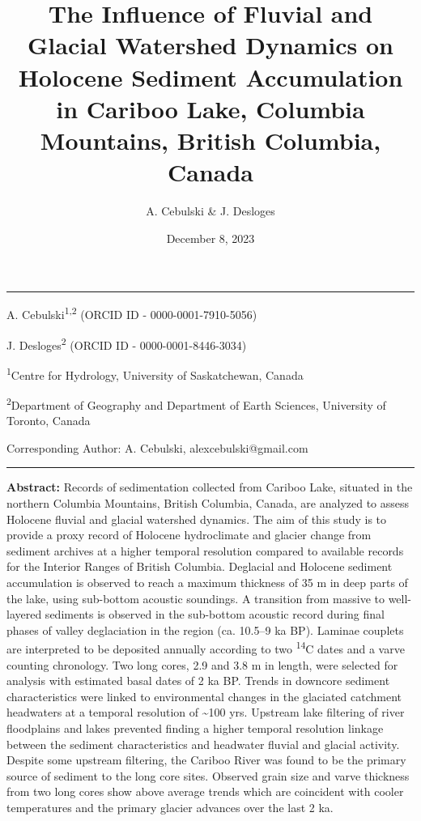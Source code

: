 \documentclass[
  letterpaper,
  DIV=11,
  numbers=noendperiod]{scrartcl}
\title{The Influence of Fluvial and Glacial Watershed Dynamics on
Holocene Sediment Accumulation in Cariboo Lake, Columbia Mountains,
British Columbia, Canada}
\author{A. Cebulski \& J. Desloges}
\date{December 8, 2023}
\begin{document}
\maketitle
\ifdefined\Shaded\renewenvironment{Shaded}{\begin{tcolorbox}[borderline west={3pt}{0pt}{shadecolor}, boxrule=0pt, frame hidden, breakable, enhanced, interior hidden, sharp corners]}{\end{tcolorbox}}\fi

\begin{center}\rule{0.5\linewidth}{0.5pt}\end{center}

A. Cebulski\textsuperscript{1,2} (ORCID ID - 0000-0001-7910-5056)

J. Desloges\textsuperscript{2} (ORCID ID - 0000-0001-8446-3034)

\textsuperscript{1}Centre for Hydrology, University of Saskatchewan,
Canada

\textsuperscript{2}Department of Geography and Department of Earth
Sciences, University of Toronto, Canada

Corresponding Author: A. Cebulski, alexcebulski@gmail.com

\begin{center}\rule{0.5\linewidth}{0.5pt}\end{center}

\pagebreak

\textbf{Abstract:} Records of sedimentation collected from Cariboo Lake,
situated in the northern Columbia Mountains, British Columbia, Canada,
are analyzed to assess Holocene fluvial and glacial watershed dynamics.
The aim of this study is to provide a proxy record of Holocene
hydroclimate and glacier change from sediment archives at a higher
temporal resolution compared to available records for the Interior
Ranges of British Columbia. Deglacial and Holocene sediment accumulation
is observed to reach a maximum thickness of 35 m in deep parts of the
lake, using sub-bottom acoustic soundings. A transition from massive to
well-layered sediments is observed in the sub-bottom acoustic record
during final phases of valley deglaciation in the region (ca. 10.5--9 ka
BP). Laminae couplets are interpreted to be deposited annually according
to two \textsuperscript{14}C dates and a varve counting chronology. Two
long cores, 2.9 and 3.8 m in length, were selected for analysis with
estimated basal dates of 2 ka BP. Trends in downcore sediment
characteristics were linked to environmental changes in the glaciated
catchment headwaters at a temporal resolution of \textasciitilde100 yrs.
Upstream lake filtering of river floodplains and lakes prevented finding
a higher temporal resolution linkage between the sediment
characteristics and headwater fluvial and glacial activity. Despite some
upstream filtering, the Cariboo River was found to be the primary source
of sediment to the long core sites. Observed grain size and varve
thickness from two long cores show above average trends which are
coincident with cooler temperatures and the primary glacier advances
over the last 2 ka.
\end{document}
